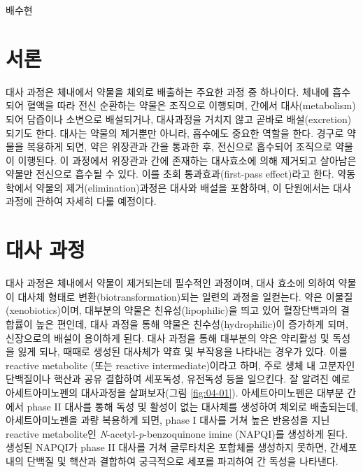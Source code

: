 \documentclass[
  11pt,
  krantz2, a4paper, twoside]{krantz}
\begin{document}
배수현
\normalsize

\hypertarget{uxc11cuxb860-3}{%
\section{서론}\label{uxc11cuxb860-3}}

대사 과정은 체내에서 약물을 체외로 배출하는 주요한 과정 중 하나이다. 체내에 흡수되어 혈액을 따라 전신 순환하는 약물은 조직으로 이행되며, 간에서 대사(metabolism)되어 담즙이나 소변으로 배설되거나, 대사과정을 거치지 않고 곧바로 배설(excretion)되기도 한다. 대사는 약물의 제거뿐만 아니라, 흡수에도 중요한 역할을 한다. 경구로 약물을 복용하게 되면, 약은 위장관과 간을 통과한 후, 전신으로 흡수되어 조직으로 약물이 이행된다. 이 과정에서 위장관과 간에 존재하는 대사효소에 의해 제거되고 살아남은 약물만 전신으로 흡수될 수 있다. 이를 초회 통과효과(first-pass effect)라고 한다. 약동학에서 약물의 제거(elimination)과정은 대사와 배설을 포함하며, 이 단원에서는 대사 과정에 관하여 자세히 다룰 예정이다.

\hypertarget{uxb300uxc0ac-uxacfcuxc815}{%
\section{대사 과정}\label{uxb300uxc0ac-uxacfcuxc815}}

대사 과정은 체내에서 약물이 제거되는데 필수적인 과정이며, 대사 효소에 의하여 약물이 대사체 형태로 변환(biotransformation)되는 일련의 과정을 일컫는다. 약은 이물질(xenobiotics)이며, 대부분의 약물은 친유성(lipophilic)을 띄고 있어 혈장단백과의 결합률이 높은 편인데, 대사 과정을 통해 약물은 친수성(hydrophilic)이 증가하게 되며, 신장으로의 배설이 용이하게 된다. 대사 과정을 통해 대부분의 약은 약리활성 및 독성을 잃게 되나, 때때로 생성된 대사체가 약효 및 부작용을 나타내는 경우가 있다. 이를 reactive metabolite (또는 reactive intermediate)이라고 하며, 주로 생체 내 고분자인 단백질이나 핵산과 공유 결합하여 세포독성, 유전독성 등을 일으킨다. 잘 알려진 예로 아세트아미노펜의 대사과정을 살펴보자(그림 \ref{fig:04-01}). 아세트아미노펜은 대부분 간에서 phase II 대사를 통해 독성 및 활성이 없는 대사체를 생성하여 체외로 배출되는데, 아세트아미노펜을 과량 복용하게 되면, phase I 대사를 거쳐 높은 반응성을 지닌 reactive metabolite인 \emph{N}-acetyl-\emph{p}-benzoquinone imine (NAPQI)를 생성하게 된다. 생성된 NAPQI가 phase II 대사를 거쳐 글루타치온 포합체를 생성하지 못하면, 간세포 내의 단백질 및 핵산과 결합하여 궁극적으로 세포를 파괴하여 간 독성을 나타낸다.
\end{document}
